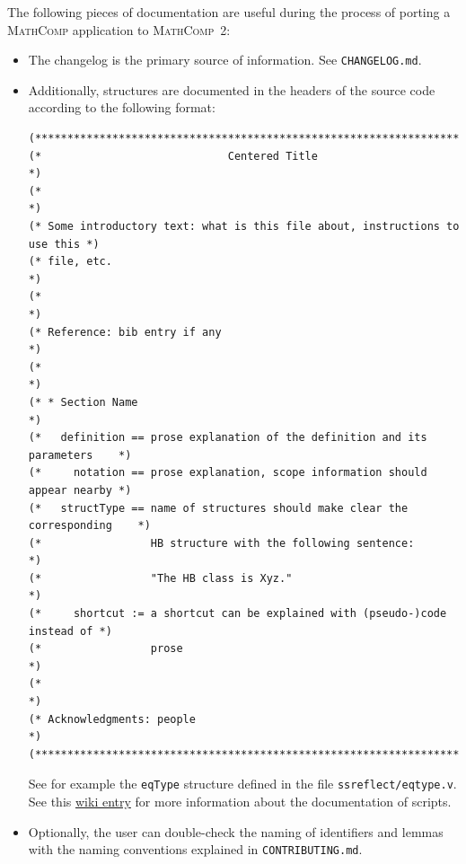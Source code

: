 \documentclass{article}
\def\mathcomp{\textsc{MathComp}}
\def\mathcomptwo{\mathcomp~2}
\def\coqin#1{\texttt{#1}}
\begin{document}
The following pieces of documentation are useful during the process of
porting a \mathcomp{} application to \mathcomptwo:
\begin{itemize}
\item The changelog is the primary source of information. See \coqin{CHANGELOG.md}.
\item Additionally, structures are documented in the headers of the
  source code according to the following format:
\begin{verbatim}
(*****************************************************************************)
(*                             Centered Title                                *)
(*                                                                           *)
(* Some introductory text: what is this file about, instructions to use this *)
(* file, etc.                                                                *)
(*                                                                           *)
(* Reference: bib entry if any                                               *)
(*                                                                           *)
(* * Section Name                                                            *)
(*   definition == prose explanation of the definition and its parameters    *)
(*     notation == prose explanation, scope information should appear nearby *)
(*   structType == name of structures should make clear the corresponding    *)
(*                 HB structure with the following sentence:                 *) 
(*                 "The HB class is Xyz."                                    *)
(*     shortcut := a shortcut can be explained with (pseudo-)code instead of *)
(*                 prose                                                     *)
(*                                                                           *)
(* Acknowledgments: people                                                   *)
(*****************************************************************************)    
\end{verbatim}
See for example the \coqin{eqType} structure defined in the file
\coqin{ssreflect/eqtype.v}.
%
See this
\href{https://github.com/math-comp/analysis/wiki/How-to-document}{wiki
  entry} for more information about the documentation of scripts.
\item Optionally, the user can double-check the naming of identifiers
  and lemmas with the naming conventions explained in
  \coqin{CONTRIBUTING.md}.
\end{itemize}
\end{document}
